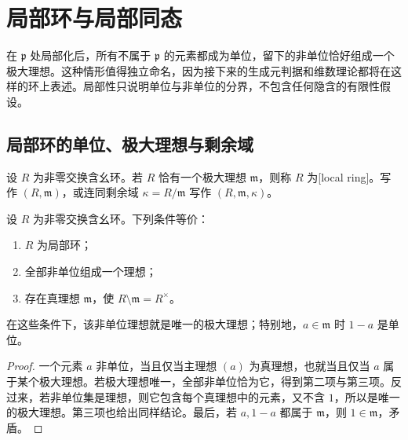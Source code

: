 
\section{局部环与局部同态}
\label{b3:sec:0205}

在 \(\mathfrak p\) 处局部化后，所有不属于 \(\mathfrak p\) 的元素都成为单位，留下的非单位恰好组成一个极大理想。这种情形值得独立命名，因为接下来的生成元判据和维数理论都将在这样的环上表述。局部性只说明单位与非单位的分界，不包含任何隐含的有限性假设。

\subsection{局部环的单位、极大理想与剩余域}
\label{b3:subsec:0205:01}

\begin{definition}\label{b3:def:local-ring}
	设 \(R\) 为非零交换含幺环。若 \(R\) 恰有一个极大理想 \(\mathfrak m\)，则称 \(R\) 为[local ring]。写作 \((R,\mathfrak m)\)，或连同剩余域 \(\kappa=R/\mathfrak m\) 写作 \((R,\mathfrak m,\kappa)\)。
\end{definition}

\begin{proposition}\label{b3:prop:local-ring-units}
	设 \(R\) 为非零交换含幺环。下列条件等价：
	\begin{enumerate}
		\item \(R\) 为局部环；
		\item 全部非单位组成一个理想；
		\item 存在真理想 \(\mathfrak m\)，使 \(R\setminus\mathfrak m=R^\times\)。
	\end{enumerate}
	在这些条件下，该非单位理想就是唯一的极大理想；特别地，\(a\in\mathfrak m\) 时 \(1-a\) 是单位。
\end{proposition}
\begin{proof}
	一个元素 \(a\) 非单位，当且仅当主理想 \((a)\) 为真理想，也就当且仅当 \(a\) 属于某个极大理想。若极大理想唯一，全部非单位恰为它，得到第二项与第三项。反过来，若非单位集是理想，则它包含每个真理想中的元素，又不含 \(1\)，所以是唯一的极大理想。第三项也给出同样结论。最后，若 \(a,1-a\) 都属于 \(\mathfrak m\)，则 \(1\in\mathfrak m\)，矛盾。
\end{proof}

